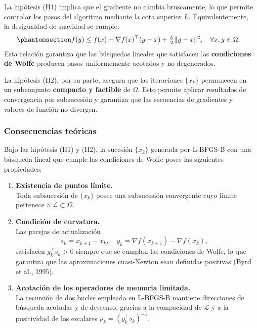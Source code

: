 \documentclass[
  spanish,
  us-letterpaper,
]{scrreprt}
\numberwithin{equation}{section}
\begin{document}
La hipótesis (H1) implica que el gradiente no cambia bruscamente, lo que
permite controlar los pasos del algoritmo mediante la cota superior
\(L\). Equivalentemente, la desigualdad de suavidad se cumple:
\begin{equation}\phantomsection\label{eq-hipotesis}{
f(y) \le f(x) + \nabla f(x)^\top (y-x) + \tfrac{L}{2}\|y-x\|^2, \quad \forall x, y \in \Omega. 
}\end{equation} Esta relación garantiza que las búsquedas lineales que
satisfacen las \textbf{condiciones de Wolfe} producen pasos
uniformemente acotados y no degenerados.

La hipótesis (H2), por su parte, asegura que las iteraciones \(\{x_k\}\)
permanecen en un subconjunto \textbf{compacto y factible} de \(\Omega\).
Esto permite aplicar resultados de convergencia por subsucesión y
garantiza que las secuencias de gradientes y valores de función no
divergen.

\subsubsection{Consecuencias teóricas}\label{consecuencias-teuxf3ricas}

Bajo las hipótesis (H1) y (H2), la sucesión \(\{x_k\}\) generada por
L-BFGS-B con una búsqueda lineal que cumple las condiciones de Wolfe
posee las siguientes propiedades:

\begin{enumerate}
\def\labelenumi{\arabic{enumi}.}
\item
  \textbf{Existencia de puntos límite.}\\
  Toda subsucesión de \(\{x_k\}\) posee una subsucesión convergente cuyo
  límite pertenece a \(\mathcal{L} \subset \Omega\).
\item
  \textbf{Condición de curvatura.}\\
  Las parejas de actualización\\
  \[
  s_k = x_{k+1} - x_k, \quad y_k = \nabla f(x_{k+1}) - \nabla f(x_k),
  \] satisfacen \(y_k^\top s_k > 0\) siempre que se cumplan las
  condiciones de Wolfe, lo que garantiza que las aproximaciones
  cuasi-Newton sean definidas positivas (Byrd et al., 1995).
\item
  \textbf{Acotación de los operadores de memoria limitada.}\\
  La recursión de dos bucles empleada en L-BFGS-B mantiene direcciones
  de búsqueda acotadas y de descenso, gracias a la compacidad de
  \(\mathcal{L}\) y a la positividad de los escalares
  \(\rho_k = (y_k^\top s_k)^{-1}\).
\end{enumerate}
\end{document}
